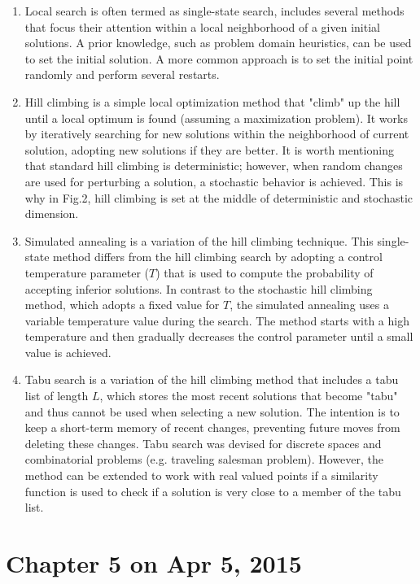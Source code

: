 \documentclass[12pt, a4paper]{article}
\begin{document}
\begin{enumerate}
\item Local search is often termed as single-state search, includes several methods that focus their attention within a local neighborhood of a given initial solutions. A prior knowledge, such as problem domain heuristics, can be used to set the initial solution. A more common approach is to set the initial point randomly and perform several restarts.

\item Hill climbing is a simple local optimization method that "climb" up the hill until a local optimum is found (assuming a maximization problem). It works by iteratively searching for new solutions within the neighborhood of current solution, adopting new solutions if they are better. It is worth mentioning that standard hill climbing is deterministic; however, when random changes are used for perturbing a solution, a stochastic behavior is achieved. This is why in Fig.2, hill climbing is set at the middle of deterministic and stochastic dimension. 

\item Simulated annealing is a variation of the hill climbing technique. This single-state method differs from the hill climbing search by adopting a control temperature parameter ($T$) that is used to compute the probability of accepting inferior solutions. In contrast to the stochastic hill climbing method, which adopts a fixed value for $T$, the simulated annealing uses a variable temperature value during the search. The method starts with a high temperature and then gradually decreases the control parameter until a small value is achieved.

\item Tabu search is a variation of the hill climbing method that includes a tabu list of length $L$, which stores the most recent solutions that become "tabu" and thus cannot be used when selecting a new solution. The intention is to keep a short-term memory of recent changes, preventing future moves from deleting these changes. Tabu search was devised for discrete spaces and combinatorial problems (e.g. traveling salesman problem). However, the method can be extended to work with real valued points if a similarity function is used to check if a solution is very close to a member of the tabu list. 

\end{enumerate}

\section{Chapter 5 on Apr 5, 2015}
\end{document}
